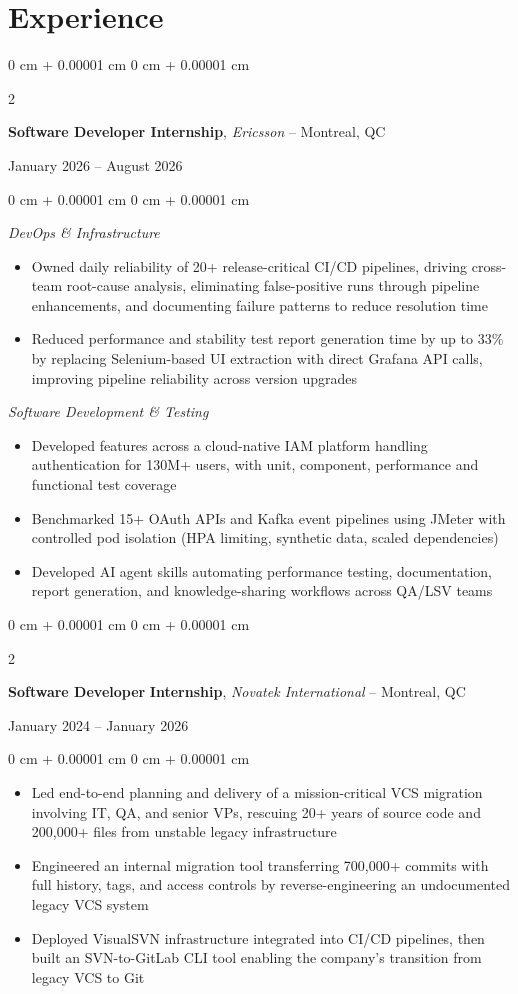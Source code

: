 \documentclass[10pt, letterpaper]{article}
\newenvironment{onecolentry}{
    \begin{adjustwidth}{
        0 cm + 0.00001 cm
    }{
        0 cm + 0.00001 cm
    }
}{
    \end{adjustwidth}
} %
\newenvironment{twocolentry}[2][]{
    \onecolentry
    \def\secondColumn{#2}
    \setcolumnwidth{\fill, 4.5 cm}
    \begin{paracol}{2}
}{
    \switchcolumn \raggedleft \secondColumn
    \end{paracol}
    \endonecolentry
} %
\begin{document}
\section{Experience}
\begin{twocolentry}{
    January 2026 – August 2026
}
\textbf{Software Developer Internship}, \textit{Ericsson} – Montreal, QC
\end{twocolentry}
\begin{onecolentry}
\textit{DevOps \& Infrastructure}
\begin{itemize}
    \item Owned daily reliability of 20+ release-critical CI/CD pipelines, driving cross-team root-cause analysis, eliminating false-positive runs through pipeline enhancements, and documenting failure patterns to reduce resolution time
    \item Reduced performance and stability test report generation time by up to 33\% by replacing Selenium-based UI extraction with direct Grafana API calls, improving pipeline reliability across version upgrades
\end{itemize}
\textit{Software Development \& Testing}
\begin{itemize}
    \item Developed features across a cloud-native IAM platform handling authentication for 130M+ users, with unit, component, performance and functional test coverage
    \item Benchmarked 15+ OAuth APIs and Kafka event pipelines using JMeter with controlled pod isolation (HPA limiting, synthetic data, scaled dependencies)
    \item Developed AI agent skills automating performance testing, documentation, report generation, and knowledge-sharing workflows across QA/LSV teams
\end{itemize}
\end{onecolentry}

\vspace{5 pt - 0.0 cm}
\begin{twocolentry}{
    January 2024 – January 2026
}
\textbf{Software Developer} \textbf{Internship}, \textit{Novatek International} – Montreal, QC
\end{twocolentry}
\vspace{0.10 cm}
\begin{onecolentry}
    \begin{itemize}
        \item Led end-to-end planning and delivery of a mission-critical VCS migration involving IT, QA, and senior VPs, rescuing 20+ years of source code and 200,000+ files from unstable legacy infrastructure
        \item Engineered an internal migration tool transferring 700,000+ commits with full history, tags, and access controls by reverse-engineering an undocumented legacy VCS system
        \item Deployed VisualSVN infrastructure integrated into CI/CD pipelines, then built an SVN-to-GitLab CLI tool enabling the company's transition from legacy VCS to Git
    \end{itemize}
\end{onecolentry}
\end{document}
